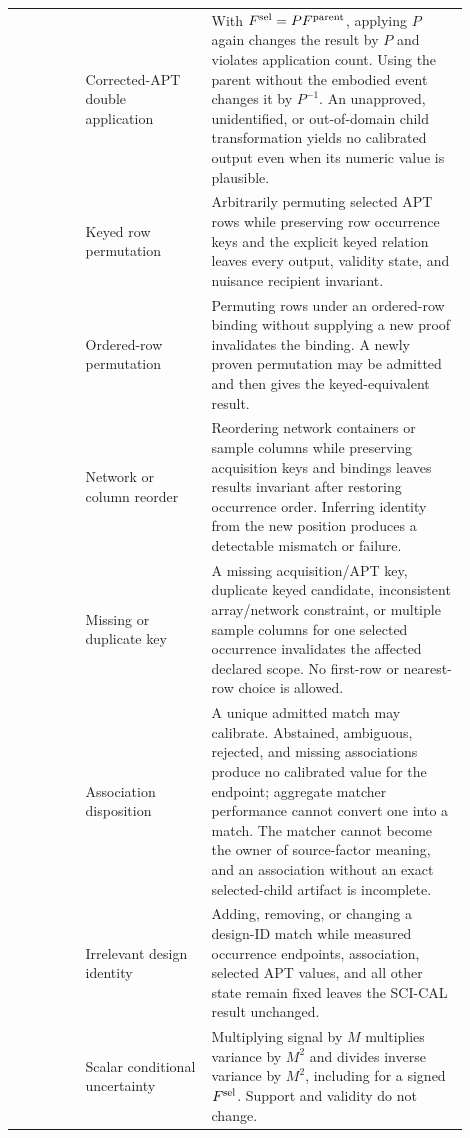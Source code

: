 \begin{longtable}{L{0.14\linewidth}L{0.25\linewidth}L{0.51\linewidth}}
 & Corrected-APT double application & With
\(F^{\rm sel}=P F^{\rm parent}\), applying \(P\) again changes the result by
\(P\) and violates application count. Using the parent without the embodied
event changes it by \(P^{-1}\). An unapproved, unidentified, or
out-of-domain child transformation yields no calibrated output even when its
numeric value is plausible. \\

 & Keyed row permutation & Arbitrarily permuting selected APT rows
while preserving row occurrence keys and the explicit keyed relation leaves
every output, validity state, and nuisance recipient invariant. \\

 & Ordered-row permutation & Permuting rows under an ordered-row
binding without supplying a new proof invalidates the binding. A newly proven
permutation may be admitted and then gives the keyed-equivalent result. \\

 & Network or column reorder & Reordering network containers or
sample columns while preserving acquisition keys and bindings leaves results
invariant after restoring occurrence order. Inferring identity from the new
position produces a detectable mismatch or failure. \\

 & Missing or duplicate key & A missing acquisition/APT key,
duplicate keyed candidate, inconsistent array/network constraint, or multiple
sample columns for one selected occurrence invalidates the affected declared
scope. No first-row or nearest-row choice is allowed. \\

 & Association disposition & A unique admitted match may calibrate.
Abstained, ambiguous, rejected, and missing associations produce no calibrated
value for the endpoint; aggregate matcher performance cannot convert one into
a match. The matcher cannot become the owner of source-factor meaning, and an
association without an exact selected-child artifact is incomplete. \\

 & Irrelevant design identity & Adding, removing, or changing a
design-ID match while measured occurrence endpoints, association, selected
APT values, and all other state remain fixed leaves the SCI-CAL result
unchanged. \\

 & Scalar conditional uncertainty & Multiplying signal by \(M\)
multiplies variance by \(M^2\) and divides inverse variance by \(M^2\),
including for a signed \(F^{\rm sel}\). Support and validity do not change. \\


\end{longtable}
